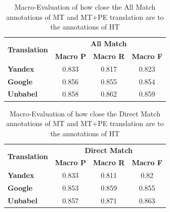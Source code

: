 \begin{table}[!htp]
\centering
\begin{tabular}{@{}lccc@{}}
\toprule
\multicolumn{1}{c}{\multirow{2}{*}{\textbf{Translation}}} & \multicolumn{3}{c}{\textbf{All Match}}                            \\ \cmidrule(l){2-4}
\multicolumn{1}{c}{}          & \textbf{Macro P}     & \textbf{Macro R}      & \textbf{Macro F}          \\ \midrule
\textbf{Yandex}   & 0.833                & 0.817                 & 0.823                   \\ 

\textbf{Google}   & 0.856                & 0.855                 & 0.854                   \\ 

\textbf{Unbabel}  & 0.858                & 0.862                 & 0.859         \\ \bottomrule 

\end{tabular}%
\caption{Macro-Evaluation of how close the All Match annotations of MT and MT+PE translation are to the annotations of HT}
\label{table: Results All Match Macro}
\end{table}


\begin{table}[!htp]
\centering
\begin{tabular}{@{}lccc@{}}
\toprule
\multicolumn{1}{c}{\multirow{2}{*}{\textbf{Translation}}} & \multicolumn{3}{c}{\textbf{Direct Match}}                            \\ \cmidrule(l){2-4}
\multicolumn{1}{c}{}          & \textbf{Macro P}     & \textbf{Macro R}      & \textbf{Macro F}          \\ \midrule
\textbf{Yandex}   & 0.833                & 0.811                 & 0.82                   \\ 

\textbf{Google}   & 0.853                & 0.859                 & 0.855                   \\ 

\textbf{Unbabel}  & 0.857                & 0.871                 & 0.863         \\ \bottomrule 

\end{tabular}%
\caption{Macro-Evaluation of how close the Direct Match annotations of MT and MT+PE translation are to the annotations of HT}
\label{table: Results Direct Match Macro}
\end{table}




